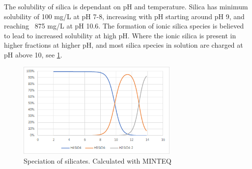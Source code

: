 The solubility of silica is dependant on pH and temperature. %
Silica has minimum solubility of 100  mg/L at pH 7-8, increasing with pH starting around pH 9, and reaching ~875 mg/L at pH 10.6. 
The formation of ionic silica species is believed to lead to increased solubility at high pH. \citep{ChemistrySilicaScale2014} %
Where the ionic silica is present in higher fractions at higher pH, and most silica species in solution are charged at pH above 10, see \cref{fig:silica_pH_fraktion}. 


\begin{figure}[H]
    \centering
    \includegraphics[width=0.7\textwidth]{Billeder/teori/pH_pC_Silica.png}
    \caption{Speciation of silicates. Calculated with MINTEQ}
    \label{fig:silica_pH_fraktion}
\end{figure}



